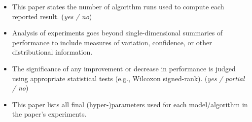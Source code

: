 \documentclass[letterpaper]{article} %
\begin{document}
\begin{itemize}
\begin{itemize}
        \item This paper states the number of algorithm runs used to compute each reported result. \hfill (\textit{yes / no})
        \item Analysis of experiments goes beyond single-dimensional summaries of performance to include measures of variation, confidence, or other distributional information. \hfill{}
        \item The significance of any improvement or decrease in performance is judged using appropriate statistical tests (e.g., Wilcoxon signed-rank). \hfill (\textit{yes / partial / no})
        \item This paper lists all final (hyper-)parameters used for each model/algorithm in the paper’s experiments. \\ 
    \end{itemize}
\end{itemize}
\end{document}

